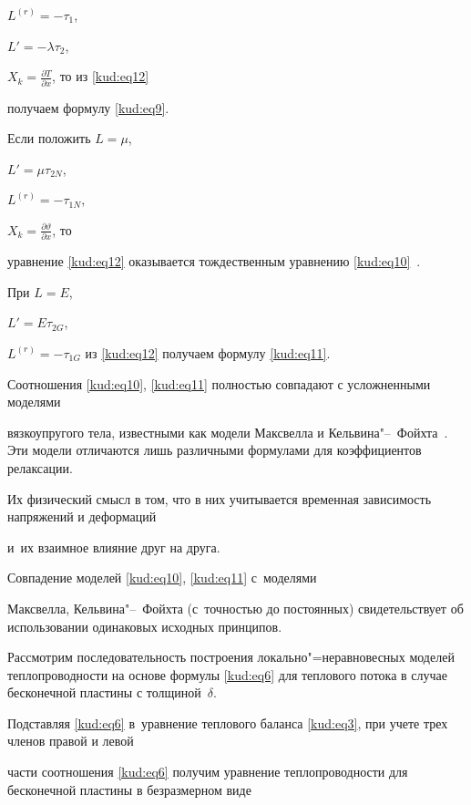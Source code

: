 $L^{(r)} =- \tau_1$,

$L'=- \lambda \tau_2$, 

$X_k =\frac{\partial T}{\partial x}$, то из \eqref{kud:eq12}

получаем формулу \eqref{kud:eq9}. 



Если положить $L= {\mu }$,

$L'= \mu \tau _{2N} $, 

$L^{(r)}=- \tau_{1N} $,

$X_k =\frac{\partial \vartheta}{\partial x}$, то

уравнение \eqref{kud:eq12} оказывается тождественным уравнению \eqref{kud:eq10}~\cite{kud:bib8}. 

При $L=E$,

$L'=E\tau _{2G} $, 

$L^{(r)}=-\tau_{1G}$ из \eqref{kud:eq12} получаем формулу \eqref{kud:eq11}.



Соотношения \eqref{kud:eq10}, \eqref{kud:eq11} полностью совпадают с усложненными моделями

вязкоупругого тела, известными как модели Максвелла и Кельвина"--~Фойхта~\cite{kud:bib14}. Эти модели отличаются лишь различными формулами для коэффициентов релаксации. 

Их физический смысл в том, что в них учитывается временная зависимость напряжений и деформаций 

и~их взаимное влияние друг на друга. 

Совпадение моделей \eqref{kud:eq10}, \eqref{kud:eq11} с~моделями

Максвелла, Кельвина"--~Фойхта (с~точностью до постоянных) свидетельствует об использовании одинаковых исходных принципов.



\smallskip




Рассмотрим последовательность построения локально"=неравновесных моделей теплопроводности на основе формулы \eqref{kud:eq6} для теплового потока в случае бесконечной пластины с толщиной~$\delta$. 

Подставляя \eqref{kud:eq6} в~уравнение теплового баланса \eqref{kud:eq3}, при учете трех членов правой и левой

части соотношения \eqref{kud:eq6} получим уравнение теплопроводности для бесконечной пластины в безразмерном виде

